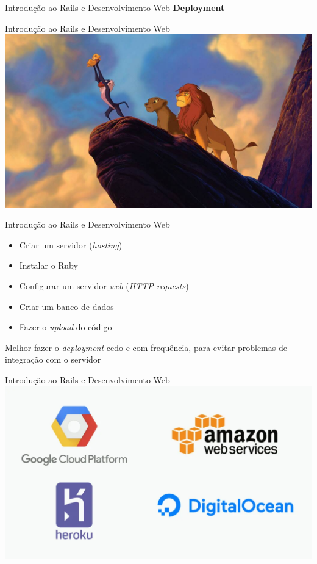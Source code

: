 \documentclass[10pt]{beamer}
\subtitle{Aula 4}
\date{14 de novembro de 2019}
\begin{document}
\maketitle

\begin{frame}{Introdução ao Rails e Desenvolvimento Web}
  \HUGE
  \centering
  \textbf{Deployment}
\end{frame}

\begin{frame}{Introdução ao Rails e Desenvolvimento Web}
  \centering
  \includegraphics[width=\textwidth]{images/lion_king.jpg}
\end{frame}

\begin{frame}{Introdução ao Rails e Desenvolvimento Web}
  \Large
  \begin{itemize}
    \item Criar um servidor (\textit{hosting})
    \item Instalar o Ruby
    \item Configurar um servidor \textit{web} (\textit{HTTP requests})
    \item Criar um banco de dados
    \item Fazer o \textit{upload} do código
  \end{itemize}
  \vfill
  \large
  Melhor fazer o \textit{deployment} cedo e com frequência, para evitar problemas de integração com o servidor
\end{frame}

\begin{frame}{Introdução ao Rails e Desenvolvimento Web}
  \centering
  \includegraphics[width=\textwidth]{images/hosting_services.png}
\end{frame}
\end{document}
